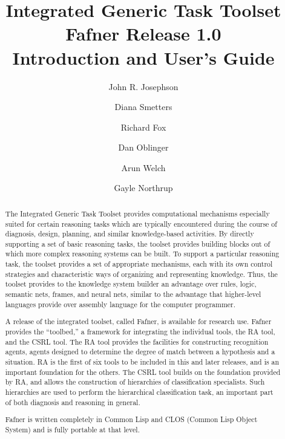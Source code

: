 \title{Integrated Generic Task Toolset\\
	 Fafner Release 1.0\\
	 Introduction and User's Guide}
\author{John R. Josephson \and  Diana Smetters\\
\and Richard Fox \and  Dan Oblinger \and Arun Welch \and Gayle Northrup}

\makeindex


\sloppy
\tableofcontents
\listoffigures

\maketitle


\begin{abstract}

The Integrated Generic Task Toolset provides computational mechanisms
especially suited for certain reasoning tasks which are typically
encountered during the course of diagnosis, design, planning, and
similar knowledge-based activities.  By directly supporting a set of
basic reasoning tasks, the toolset provides building blocks out of
which more complex reasoning systems can be built.  To support a
particular reasoning task, the toolset provides a set of appropriate
mechanisms, each with its own control strategies and characteristic
ways of organizing and representing knowledge.  Thus, the toolset
provides to the knowledge system builder an advantage over rules,
logic, semantic nets, frames, and neural nets, similar to the
advantage that higher-level languages provide over assembly language
for the computer programmer.

A release of the integrated toolset, called Fafner, is available for
research use.  Fafner provides the ``toolbed,'' a framework for
integrating the individual tools, the RA tool, and the CSRL tool. The
RA tool provides the facilities for constructing recognition agents,
agents designed to determine the degree of match between a hypothesis
and a situation.  RA is the first of six tools to be included in this
and later releases, and is an important foundation for the others.
The CSRL tool builds on the foundation provided by RA, and allows the
construction of hierarchies of classification specialists. Such
hierarchies are used to perform the hierarchical classification task,
an important part of both diagnosis and reasoning in general.

Fafner is written completely in Common Lisp and CLOS (Common Lisp
Object System) and is fully portable at that level.

\end{abstract}


